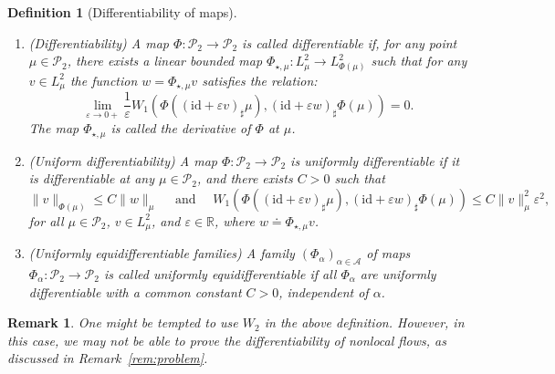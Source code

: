 \documentclass[sn-mathphys-num]{sn-jnl}
\numberwithin{equation}{section}
\theoremstyle{mythm}
\theoremstyle{mydef}
\newtheorem{remark}[proposition]{Remark}
\newtheorem{definition}[proposition]{Definition}
\newcommand{\id}{\mathrm{id}}
\begin{document}
\begin{definition}[Differentiability of maps]
\label{def:diff_mp}
\quad
    \begin{enumerate}
        \item (\emph{Differentiability}) A map \( \Phi \colon \mathcal{P}_2 \to \mathcal{P}_2 \) is called \emph{differentiable} if, for any point $\mu\in \mathcal{P}_2$, there exists a linear bounded map \(\Phi_{\star,\mu} \colon {L}^2_{\mu} \to L^2_{\Phi(\mu)} \) such that for any \( v \in {L}^2_{\mu} \) the function \( w = \Phi_{\star,\mu}v \) satisfies the relation:
\[
  \lim_{\varepsilon\to 0+}\frac{1}{\varepsilon}W_1\left(\Phi\left((\id+\varepsilon v)_\sharp \mu\right), (\id +\varepsilon w)_\sharp \Phi(\mu)\right) = 0.
\]
The map \(\Phi_{\star,\mu} \) is called the \emph{derivative} of \( \Phi \) at \( \mu \).

\item (\emph{Uniform differentiability}) A map \( \Phi\colon \mathcal{P}_2\to \mathcal{P}_{2} \) is \emph{uniformly differentiable} if it is differentiable at any \( \mu\in \mathcal{P}_2 \), and there exists \( C>0 \) such that
  \[
    \|v\|_{\Phi(\mu)}\le C\|w\|_{\mu}\quad \mbox{ and }\quad
    W_1\left(\Phi\left((\id+\varepsilon v)_{\sharp}\mu\right),(\id+\varepsilon w)_{\sharp}\Phi(\mu)\right)\le C\|v\|^{2}_{\mu}\varepsilon^2,
  \]
  for all \( \mu\in \mathcal{P}_2 \), \( v\in {L}^2_{\mu} \), and \( \varepsilon\in \mathbb{R} \), where \( w \doteq \Phi_{\star,\mu} v \).

  \item (\emph{Uniformly equidifferentiable families}) A family $(\Phi_\alpha)_{\alpha\in \mathcal A}$ of maps \( \Phi_\alpha\colon \mathcal{P}_2\to \mathcal{P}_2 \) is called uniformly equidifferentiable if all $\Phi_\alpha$ are uniformly differentiable with a common constant $C>0$, independent of $\alpha$. 
    \end{enumerate}
\end{definition}

\begin{remark}
  \label{rem:stronger}
  One might be tempted to use \( W_2 \) in the above definition. However, in this case, we may not be able to prove the differentiability of nonlocal flows, as discussed in Remark~\ref{rem:problem}.
\end{remark}
\end{document}
